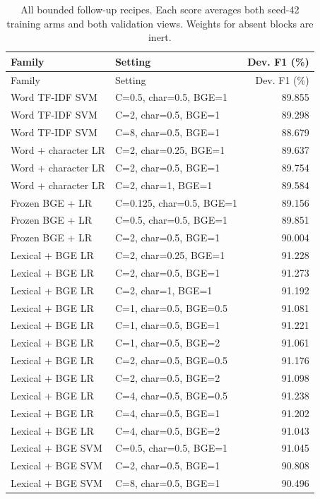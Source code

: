 \begin{longtable}{lp{7cm}r}
\caption{All bounded follow-up recipes. Each score averages both seed-42 training arms and both validation views. Weights for absent blocks are inert.}\label{tab:trials}\\
\toprule Family & Setting & Dev. F1 (\%) \\ \midrule\endfirsthead
\toprule Family & Setting & Dev. F1 (\%) \\ \midrule\endhead
Word TF-IDF SVM & C=0.5, char=0.5, BGE=1 & 89.855 \\
Word TF-IDF SVM & C=2, char=0.5, BGE=1 & 89.298 \\
Word TF-IDF SVM & C=8, char=0.5, BGE=1 & 88.679 \\
Word + character LR & C=2, char=0.25, BGE=1 & 89.637 \\
Word + character LR & C=2, char=0.5, BGE=1 & 89.754 \\
Word + character LR & C=2, char=1, BGE=1 & 89.584 \\
Frozen BGE + LR & C=0.125, char=0.5, BGE=1 & 89.156 \\
Frozen BGE + LR & C=0.5, char=0.5, BGE=1 & 89.851 \\
Frozen BGE + LR & C=2, char=0.5, BGE=1 & 90.004 \\
Lexical + BGE LR & C=2, char=0.25, BGE=1 & 91.228 \\
Lexical + BGE LR & C=2, char=0.5, BGE=1 & 91.273 \\
Lexical + BGE LR & C=2, char=1, BGE=1 & 91.192 \\
Lexical + BGE LR & C=1, char=0.5, BGE=0.5 & 91.081 \\
Lexical + BGE LR & C=1, char=0.5, BGE=1 & 91.221 \\
Lexical + BGE LR & C=1, char=0.5, BGE=2 & 91.061 \\
Lexical + BGE LR & C=2, char=0.5, BGE=0.5 & 91.176 \\
Lexical + BGE LR & C=2, char=0.5, BGE=2 & 91.098 \\
Lexical + BGE LR & C=4, char=0.5, BGE=0.5 & 91.238 \\
Lexical + BGE LR & C=4, char=0.5, BGE=1 & 91.202 \\
Lexical + BGE LR & C=4, char=0.5, BGE=2 & 91.043 \\
Lexical + BGE SVM & C=0.5, char=0.5, BGE=1 & 91.045 \\
Lexical + BGE SVM & C=2, char=0.5, BGE=1 & 90.808 \\
Lexical + BGE SVM & C=8, char=0.5, BGE=1 & 90.496 \\

\end{longtable}
